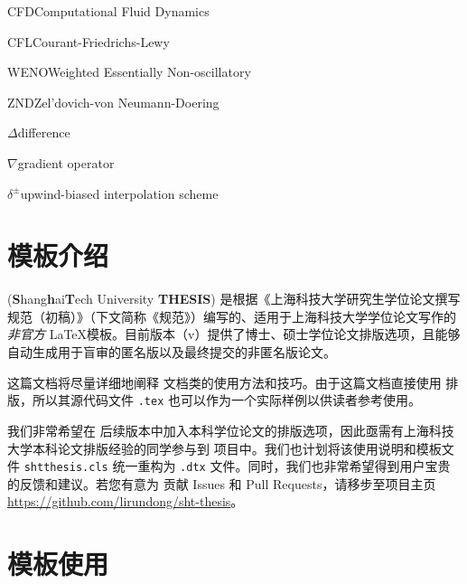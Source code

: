 \documentclass[
  fontset = mac,
]{shtthesis}
\begin{document}
\begin{nomenclatures}[缩写]
  \item{CFD}{Computational Fluid Dynamics}
  \item{CFL}{Courant-Friedrichs-Lewy}
  \item{WENO}{Weighted Essentially Non-oscillatory}
  \item{ZND}{Zel'dovich-von Neumann-Doering}
\end{nomenclatures}

\begin{nomenclatures}[算子 \& 说明]
  \item{$\Delta$}{difference}
  \item{$\nabla$}{gradient operator}
  \item{$\delta^{\pm}$}{upwind-biased interpolation scheme}
\end{nomenclatures}

\mainmatter
\chapter{模板介绍}
\shtthesis (\textbf{S}hang\textbf{h}ai\textbf{T}ech University \textbf{THESIS}) 是根据《上海科技大学研究生学位论文撰写规范（初稿）》（下文简称《规范》）编写的、适用于上海科技大学学位论文写作的\emph{非官方} \LaTeX 模板。目前版本（v\version）提供了博士、硕士学位论文排版选项，且能够自动生成用于盲审的匿名版以及最终提交的非匿名版论文。

这篇文档将尽量详细地阐释 \shtthesis 文档类的使用方法和技巧。由于这篇文档直接使用 \shtthesis 排版，所以其源代码文件 \texttt{\jobname\-.tex} 也可以作为一个实际样例以供读者参考使用。

我们非常希望在 \shtthesis 后续版本中加入本科学位论文的排版选项，因此亟需有上海科技大学本科论文排版经验的同学参与到 \shtthesis 项目中。我们也计划将该使用说明和模板文件 \verb|shtthesis.cls| 统一重构为 \verb|.dtx| 文件。同时，我们也非常希望得到用户宝贵的反馈和建议。若您有意为 \shtthesis 贡献 Issues 和 Pull Requests，请移步至项目主页 \url{https://github.com/lirundong/sht-thesis}。

\chapter{模板使用}
\end{document}
